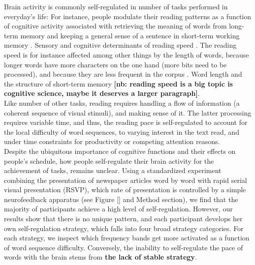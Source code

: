 Brain activity is commonly self-regulated in number of tasks performed in everyday's life: For instance, people modulate their reading patterns as a function of cognitive activity associated with retrieving the meaning of words from long-term memory \cite{federmeier1999rose} and keeping a general sense of a sentence in short-term working memory \cite{jackson1979processing}. Sensory and cognitive determinants of reading speed \cite{jackson1975sensory}. The reading speed is for instance affected among other things by the length of words, because longer words have more characters on the one hand (more bits need to be processed), and because they are less frequent in the corpus \cite{jackson1979processing}. Word length and the structure of short-term memory \cite{baddeley1975word}  {\bf [nb: reading speed is a big topic is cognitive science, maybe it deserves a larger paragraph]}.\\

Like number of other tasks, reading requires handling a flow of information (a coherent sequence of visual stimuli), and making sense of it. The latter processing requires variable time, and thus, the reading pace is self-regulated to account for the local difficulty of word sequences, to varying interest in the text read, and under time constraints for productivity or competing attention reasons.\\


Despite the ubiquitous importance of cognitive functions and their effects on people's schedule, how people self-regulate their brain activity for the achievement of tasks, remains unclear. Using a standardized experiment combining the presentation of newspaper articles word by word with rapid serial visual presentation (RSVP), which rate of presentation is controlled by a simple neurofeedback apparatus (see Figure \ref{} and Method section), we find that the majority of participants achieve a high level of self-regulation. However, our results show that there is no unique pattern, and each participant develops her own self-regulation strategy, which falls into four broad strategy categories. For each strategy, we inspect which frequency bands get more activated as a function of word sequence difficulty. Conversely, the inability to self-regulate the pace of words with the brain stems from {\bf the lack of stable strategy}. \\



